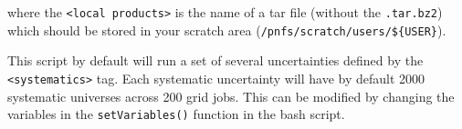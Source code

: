 where the \lstinline{<local products>} is the name of a tar file (without the \lstinline|.tar.bz2|) which should be stored in your scratch area (\lstinline|/pnfs/scratch/users/${USER}|).

This script by default will run a set of several uncertainties defined by the \lstinline|<systematics>| tag. Each systematic uncertainty will have by default 2000 systematic universes across 200 grid jobs. This can be modified by changing the variables in the \lstinline|setVariables()| function in the bash script.